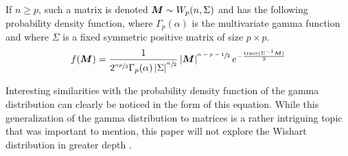 \documentclass[12pt]{article}
\begin{document}
If $n\geq p$, such a matrix is denoted $\bm{M}\sim W_p(n, \Sigma)$ and has the following probability density function,
where $\Gamma_p(\alpha)$ is the multivariate gamma function and where $\Sigma$ is a fixed symmetric positive matrix of
size $p \times p$.
\begin{equation}
	f(\bm{M}) = \frac{1}{2^{\sfrac{np}{2}}\Gamma_p(\alpha)\left|\Sigma\right|^{\sfrac{n}{2}}}\left|\bm{M}\right|^{\sfrac{n-p-1}{2}}e^{-\frac{\text{trace}(\Sigma^{-1}\bm{M})}{2}}
\end{equation}

Interesting similarities with the probability density function of the gamma distribution can clearly be noticed in the
form of this equation. While this generalization of the gamma distribution to matrices is a rather intriguing topic that
was important to mention, this paper will not explore the Wishart distribution in greater depth
\cite{wikipediaWishartDistribution2022}.
\pagebreak
\end{document}
